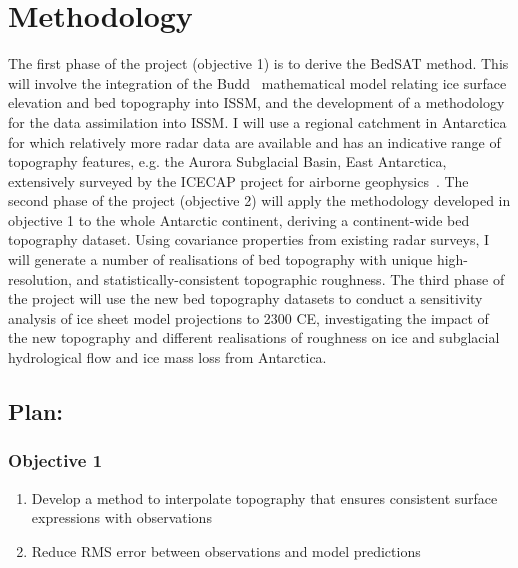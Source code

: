\chapter{Methodology}



The first phase of the project (objective 1) is to derive the BedSAT method. This will involve the integration of the Budd~\cite{Budd_1970} mathematical model relating ice surface elevation and bed topography into ISSM, and the development of a methodology for the data assimilation into ISSM. I will use a regional catchment in Antarctica for which relatively more radar data are available and has an indicative range of topography features, e.g. the Aurora Subglacial Basin, East Antarctica, extensively surveyed by the ICECAP project for airborne geophysics~\cite{Young_2011}. The second phase of the project (objective 2) will apply the methodology developed in objective 1 to the whole Antarctic continent, deriving a continent-wide bed topography dataset. Using covariance properties from existing radar surveys, I will generate a number of realisations of bed topography with unique high-resolution, and statistically-consistent topographic roughness. The third phase of the project will use the new bed topography datasets to conduct a sensitivity analysis of ice sheet model projections to 2300 CE, investigating the impact of the new topography and different realisations of roughness on ice and subglacial hydrological flow and ice mass loss from Antarctica.\\

\section*{Plan:}
\subsection*{Objective 1}
\begin{enumerate}
\item Develop a method to interpolate topography that ensures consistent surface expressions with observations
\item Reduce RMS error between observations and model predictions
\end{enumerate}

